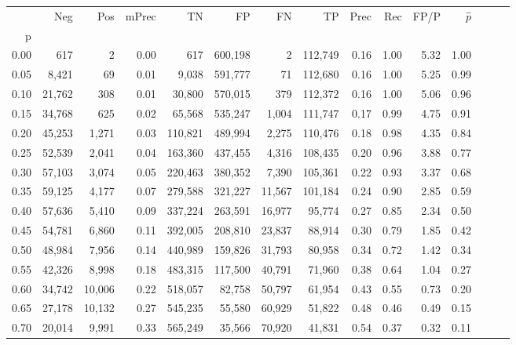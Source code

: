 \begin{tabular}{rrrrrrrrrrrrrrr}
\toprule
{} &     Neg &     Pos & mPrec &       TN &       FP &       FN &       TP &  Prec &   Rec &  FP/P & $\hat{p}$ \\
p    &         &         &       &          &          &          &          &       &       &       &           \\
\midrule
0.00 &     617 &       2 &  0.00 &      617 &  600,198 &        2 &  112,749 &  0.16 &  1.00 &  5.32 &      1.00 \\
0.05 &   8,421 &      69 &  0.01 &    9,038 &  591,777 &       71 &  112,680 &  0.16 &  1.00 &  5.25 &      0.99 \\
0.10 &  21,762 &     308 &  0.01 &   30,800 &  570,015 &      379 &  112,372 &  0.16 &  1.00 &  5.06 &      0.96 \\
0.15 &  34,768 &     625 &  0.02 &   65,568 &  535,247 &    1,004 &  111,747 &  0.17 &  0.99 &  4.75 &      0.91 \\
0.20 &  45,253 &   1,271 &  0.03 &  110,821 &  489,994 &    2,275 &  110,476 &  0.18 &  0.98 &  4.35 &      0.84 \\
0.25 &  52,539 &   2,041 &  0.04 &  163,360 &  437,455 &    4,316 &  108,435 &  0.20 &  0.96 &  3.88 &      0.77 \\
0.30 &  57,103 &   3,074 &  0.05 &  220,463 &  380,352 &    7,390 &  105,361 &  0.22 &  0.93 &  3.37 &      0.68 \\
0.35 &  59,125 &   4,177 &  0.07 &  279,588 &  321,227 &   11,567 &  101,184 &  0.24 &  0.90 &  2.85 &      0.59 \\
0.40 &  57,636 &   5,410 &  0.09 &  337,224 &  263,591 &   16,977 &   95,774 &  0.27 &  0.85 &  2.34 &      0.50 \\
0.45 &  54,781 &   6,860 &  0.11 &  392,005 &  208,810 &   23,837 &   88,914 &  0.30 &  0.79 &  1.85 &      0.42 \\
0.50 &  48,984 &   7,956 &  0.14 &  440,989 &  159,826 &   31,793 &   80,958 &  0.34 &  0.72 &  1.42 &      0.34 \\
0.55 &  42,326 &   8,998 &  0.18 &  483,315 &  117,500 &   40,791 &   71,960 &  0.38 &  0.64 &  1.04 &      0.27 \\
0.60 &  34,742 &  10,006 &  0.22 &  518,057 &   82,758 &   50,797 &   61,954 &  0.43 &  0.55 &  0.73 &      0.20 \\
0.65 &  27,178 &  10,132 &  0.27 &  545,235 &   55,580 &   60,929 &   51,822 &  0.48 &  0.46 &  0.49 &      0.15 \\
0.70 &  20,014 &   9,991 &  0.33 &  565,249 &   35,566 &   70,920 &   41,831 &  0.54 &  0.37 &  0.32 &      0.11 \\

\end{tabular}
